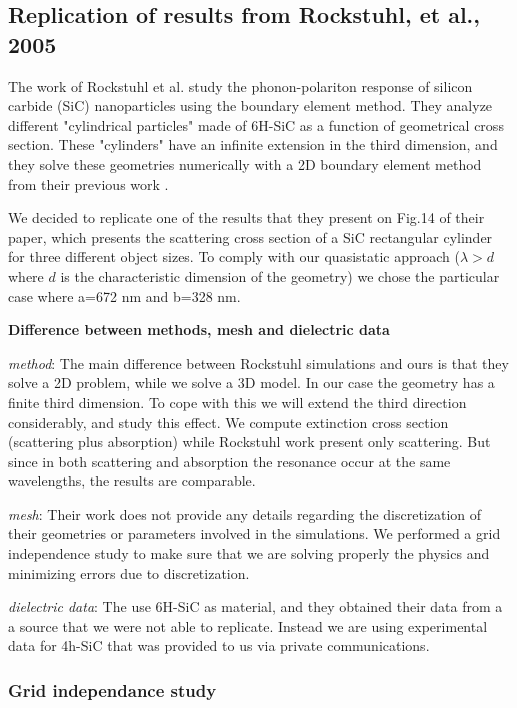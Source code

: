 
\subsection{Replication of results from Rockstuhl, et al., 2005}

The work of Rockstuhl et al.\cite{rockstuhl2005} study the phonon-polariton response of silicon carbide (SiC)
nanoparticles using the boundary element method. They analyze different "cylindrical particles"
made of 6H-SiC as a function of geometrical cross section. These "cylinders" have an infinite
extension in the third dimension, and they solve these geometries numerically with a 2D 
boundary element method from their previous work \cite{rockstuhl2003}. 

We decided to replicate one of the results that they present on Fig.14 of their paper, which 
presents the scattering cross section of a SiC rectangular cylinder for three different object 
sizes. To comply with our quasistatic approach ($\lambda > d$ where $d$ is the characteristic
dimension of the geometry) we chose the particular case where a=672 nm and b=328 nm.

\textbf{Difference between methods, mesh and dielectric data}

\textit{method}: The main difference between Rockstuhl simulations and ours is that they solve a 2D problem, 
while we solve a 3D model. In our case the geometry has a finite third dimension. To cope with this
we will extend the third direction considerably, and study this effect.
We compute extinction cross section (scattering plus absorption) while Rockstuhl work present only scattering. 
But since in both scattering and absorption the resonance occur at the same wavelengths, the results are 
comparable.

\textit{mesh}: Their work does not provide any details regarding the discretization of their geometries or 
parameters involved in the simulations. We performed a grid independence study to make sure that we are
solving properly the physics and minimizing errors due to discretization. 

\textit{dielectric data}: The use 6H-SiC as material, and they obtained their data from a a source that we
were not able to replicate. Instead we are using experimental data for 4h-SiC that was provided to us 
via private communications.  

\subsubsection{Grid independance study}

